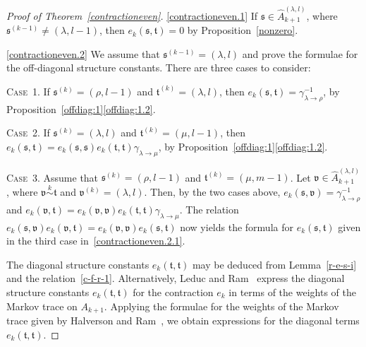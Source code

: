 \documentclass[11pt,a4paper,reqno,svgnames]{amsart}
\theoremstyle{plain}
\theoremstyle{definition}
\numberwithin{equation}{section}
\begin{document}
\begin{proof}[Proof of Theorem~\ref{contractioneven}]
\eqref{contractioneven.1} If $\mathfrak{s}\in\hat{A}_{k+1}^{(\lambda,l)}$, where $\mathfrak{s}^{(k-1)}\ne(\lambda,l-1)$, then $e_k(\mathfrak{s,t})=0$ by Proposition~\ref{nonzero}.

\eqref{contractioneven.2} We assume that $\mathfrak{s}^{(k-1)}=(\lambda,l)$ and prove the formulae for the off-diagonal structure constants. There are three cases to consider:

{\textsc{Case~1.}} If $\mathfrak{s}^{(k)}=(\rho,l-1)$ and $\mathfrak{t}^{(k)}=(\lambda,l)$, then $e_k(\mathfrak{s,t})=\gamma_{\lambda\to\rho}^{-1}$, by Proposition~\ref{offdiag:1}\eqref{offdiag:1.2}. 

{\textsc{Case~2.}} If $\mathfrak{s}^{(k)}=(\lambda,l)$ and $\mathfrak{t}^{(k)}=(\mu,l-1)$, then $e_k(\mathfrak{s,t})=e_k(\mathfrak{s,s}) e_k(\mathfrak{t,t})\gamma_{\lambda\to\mu}$, by Proposition~\ref{offdiag:1}\eqref{offdiag:1.2}. 

{\textsc{Case~3.}} Assume that $\mathfrak{s}^{(k)}=(\rho,l-1)$ and $\mathfrak{t}^{(k)}=(\mu,m-1)$. Let $\mathfrak{v}\in\hat{A}_{k+1}^{(\lambda,l)}$, where $\mathfrak{v}\stackrel{k}{\sim}\mathfrak{t}$ and $\mathfrak{v}^{(k)}=(\lambda,l)$. Then, by the two cases above, $e_k(\mathfrak{s,v})=\gamma_{\lambda\to\rho}^{-1}$ and $e_k(\mathfrak{v,t})=e_k(\mathfrak{v,v}) e_k(\mathfrak{t,t})\gamma_{\lambda\to\mu}$. The relation $e_k(\mathfrak{s,v})e_k(\mathfrak{v,t})= e_k(\mathfrak{v,v})e_k(\mathfrak{s,t})$ now yields the formula for $e_k(\mathfrak{s,t})$ given in the third case in~\eqref{contractioneven.2.1}. 

The diagonal structure constants $e_k(\mathfrak{t,t})$ may be deduced from Lemma~\ref{r-e-s-i} and the relation~\eqref{c-f-r-1}. Alternatively, Leduc and Ram~\cite[Theorem~3.12]{MR1427801} express the diagonal structure constants $e_k(\mathfrak{t,t})$ for the contraction $e_k$ in terms of the weights of the Markov trace on $A_{k+1}$. Applying the formulae for the weights of the Markov trace given by Halverson and Ram~\cite[Proposition~3.24]{MR2143201}, we obtain expressions for the diagonal terms $e_k(\mathfrak{t},\mathfrak{t})$.
\end{proof}
\end{document}
